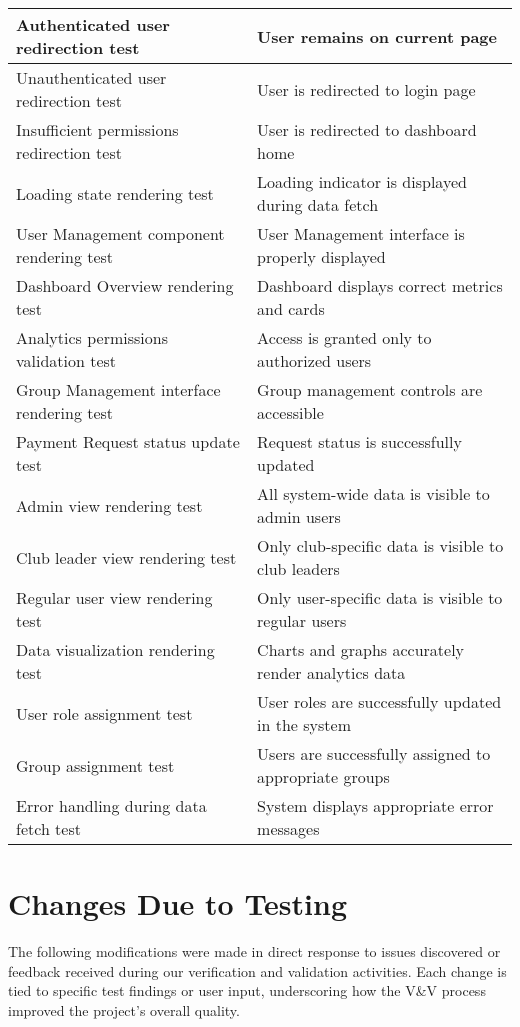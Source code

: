 \documentclass[12pt, titlepage]{article}
\begin{document}
\begin{longtable}{|p{}|p{}|}
  Authenticated user redirection test & User remains on current page \\
  \hline
  Unauthenticated user redirection test & User is redirected to login page \\
  \hline
  Insufficient permissions redirection test & User is redirected to dashboard home \\
  \hline
  Loading state rendering test & Loading indicator is displayed during data fetch \\
  \hline
  User Management component rendering test & User Management interface is properly displayed \\
  \hline
  Dashboard Overview rendering test & Dashboard displays correct metrics and cards \\
  \hline
  Analytics permissions validation test & Access is granted only to authorized users \\
  \hline
  Group Management interface rendering test & Group management controls are accessible \\
  \hline
  Payment Request status update test & Request status is successfully updated \\
  \hline
  Admin view rendering test & All system-wide data is visible to admin users \\
  \hline
  Club leader view rendering test & Only club-specific data is visible to club leaders \\
  \hline
  Regular user view rendering test & Only user-specific data is visible to regular users \\
  \hline
  Data visualization rendering test & Charts and graphs accurately render analytics data \\
  \hline
  User role assignment test & User roles are successfully updated in the system \\
  \hline
  Group assignment test & Users are successfully assigned to appropriate groups \\
  \hline
  Error handling during data fetch test & System displays appropriate error messages \\
  \hline
  \end{longtable}

\section{Changes Due to Testing}

The following modifications were made in direct response to issues discovered
or feedback received during our verification and validation activities. Each
change is tied to specific test findings or user input, underscoring how
the V\&V process improved the project’s overall quality.
\end{document}
